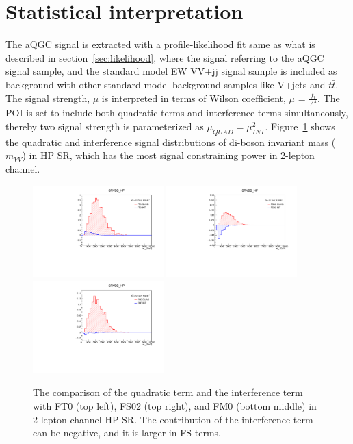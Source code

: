 \section{Statistical interpretation}
The aQGC signal is extracted with a profile-likelihood fit same as what is described in section~\ref{sec:likelihood}, where the signal referring to the aQGC signal sample, and the standard model EW VV+jj signal sample is included as background with other standard model background samples like V+jets and $t\bar{t}$.
The signal strength, $\mu$ is interpreted in terms of Wilson coefficient, $\mu$ = $\frac{f_i}{\Lambda^4}$. 
The POI is set to include both quadratic terms and interference terms simultaneously, thereby two signal strength is parameterized as $\mu_{QUAD} = \mu_{INT}^2$.
Figure~\ref{fig:quadint} shows the quadratic and interference signal distributions of di-boson invariant mass ($m_{VV}$) in HP SR, which has the most signal constraining power in 2-lepton channel.
\begin{figure}[ht]
    \centering
        \includegraphics[width=0.45\textwidth]{figures/aQGC/FT0_0ptag1pfat0pjet_0ptv_SRVBS_HP_MllJ.pdf}
    	\includegraphics[width=0.45\textwidth]{figures/aQGC/FS02_0ptag1pfat0pjet_0ptv_SRVBS_HP_MllJ.pdf}
        \includegraphics[width=0.45\textwidth]{figures/aQGC/FM0_0ptag1pfat0pjet_0ptv_SRVBS_HP_MllJ.pdf}
        \caption{The comparison of the quadratic term and the interference term with FT0 (top left), FS02 (top right), and FM0 (bottom middle) in 2-lepton channel HP SR. The contribution of the interference term can be negative, and it is larger in FS terms. }
        \label{fig:quadint}
\end{figure}



